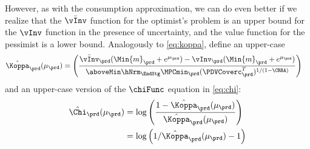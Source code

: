 \documentclass[titlepage, headings=optiontotocandhead]{econark}
\begin{document}
  However, as with the consumption approximation, we can do even better if we
  realize that the $\bar{\vInv}$ function for the optimist's problem is
  an upper bound for the ${\vInv}$ function in the presence of uncertainty, and the value function
  for the pessimist is a lower bound. Analogously to \eqref{eq:koppa}, define an upper-case
  \begin{equation}\begin{gathered}\begin{aligned}
        \hat{\Koppa}_{\prd}(\mu_{\prd})   & = \left(\frac{\bar{\vInv}_{\prd}(\Min{m}_{\prd}+e^{\mu_{\prd}})-\vInv_{\prd}(\Min{m}_{\prd}+e^{\mu_{\prd}})}{\aboveMin \hNrm_{\EndStg} \MPCmin_{\prd} (\PDVCoverc_{\prd}^{T})^{1/(1-\CRRA)}}\right) \label{eq:Koppa}
      \end{aligned}\end{gathered}\end{equation}
  and an upper-case version of the $\chiFunc$ equation in \eqref{eq:chi}:
  \begin{equation}\begin{gathered}\begin{aligned}
        \hat{\Chi}_{\prd}(\mu_{\prd})  & = \log \left(\frac{1-\hat{\Koppa}_{\prd}(\mu_{\prd})}{\hat{\Koppa}_{\prd}(\mu_{\prd})}\right)
        \\  & = \log \left(1/\hat{\Koppa}_{\prd}(\mu_{\prd})-1\right) \label{eq:Chi}
      \end{aligned}\end{gathered}\end{equation}
\end{document}
